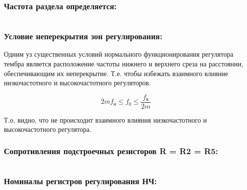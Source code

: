 \subsubsection{Частота раздела определяется:} %
  
  \begin{equation}
    \label{eq:equation5_2}
      
   \end{equation} 


\subsubsection{Условие неперекрытия зон регулирования:} %
Одним уз существенных условий нормального функционирования регулятора тембра является расположение частоты нижнего и верхнего среза на расстоянии, обеспечивающим их неперекрытие. Т.е. чтобы избежать взаимного влияние низкочастотного и высокочастотного регуляторов. \par

  \begin{equation}
    \label{eq:equation5_3}
      2 m f_{\text{н}} \leq f_0 \leq \dfrac{f_{\text{в}}}{2m} 
 \end{equation} 
 \begin{equation}
   \label{eq:equation5_4}
    
  \end{equation} 

    Т.о. видно, что не происходит взаимного влияния низкочастотного и высокочастотного регулятора.


\subsubsection{Сопротивления подстроечных резисторов R = R2 = R5:}
\begin{equation}
   \label{eq:equation5_5}
	
\end{equation} 

\subsubsection{ Номиналы регистров регулирования НЧ:}
\begin{equation}
   \label{eq:equation5_6}
   
   \end{equation} 
   \begin{equation}
   \label{eq:equation5_7}
   
   \end{equation} 
